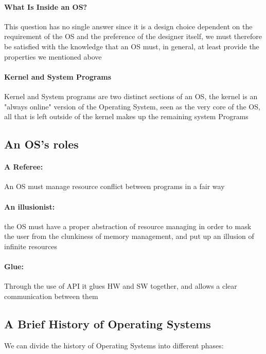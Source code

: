 \documentclass[openright, twoside]{report}
\theoremstyle{definition}
\theoremstyle{example}
\begin{document}
	\paragraph{What Is Inside an OS?} This question has no single answer
	since it is a design choice dependent on the requirement of the OS
	and the preference of the designer itself, we must therefore be satisfied
	with the knowledge that an OS must, in general, at least provide the
	properties we mentioned above

	\paragraph{Kernel and System Programs} 
	\label{par:kernel}
	Kernel and System programs are two distinct sections of an OS,
	the kernel is an "always online" version of the Operating System, seen as the
	very core of the OS, all that is left outside of the kernel makes up the remaining
	system Programs

	\subsection{An OS's roles}

	\paragraph{A Referee:} An OS must manage resource conflict
	between programs in a fair way

	\paragraph{An illusionist:} the OS must have a proper abstraction
	of resource managing in order to mask the user from the clunkiness of
	memory management, and put up an illusion of infinite resources

	\paragraph{Glue:} Through the use of API it glues HW and SW together, and allows
	a clear communication between them

	\subsection{A Brief History of Operating Systems}

	We can divide the history of Operating Systems into different phases:
\end{document}
